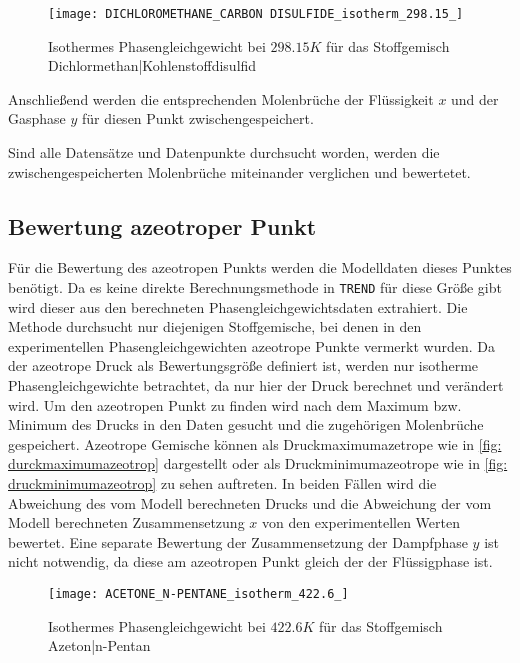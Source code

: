 \documentclass[../thesis.tex]{subfiles}
\begin{document}
\begin{figure}[htb]
	\centering
	\texttt{[image: DICHLOROMETHANE\_CARBON DISULFIDE\_isotherm\_298.15\_]}
	\caption{Isothermes Phasengleichgewicht bei $ 298.15 K$ für das Stoffgemisch Dichlormethan|Kohlenstoffdisulfid}
	\label{fig: phase_eq_datenausschluss}
\end{figure}

Anschließend werden die entsprechenden Molenbrüche der Flüssigkeit $x$ und der Gasphase $y$ für diesen Punkt zwischengespeichert.

Sind alle Datensätze und Datenpunkte durchsucht worden, werden die zwischengespeicherten Molenbrüche miteinander verglichen und bewertetet.

\subsection{Bewertung azeotroper Punkt}

Für die Bewertung des azeotropen Punkts werden die Modelldaten dieses Punktes benötigt. Da es keine direkte Berechnungsmethode in \texttt{TREND} für diese Größe gibt wird dieser aus den berechneten Phasengleichgewichtsdaten extrahiert. Die Methode durchsucht nur diejenigen Stoffgemische, bei denen in den experimentellen Phasengleichgewichten azeotrope Punkte vermerkt wurden. Da der azeotrope Druck als Bewertungsgröße definiert ist, werden nur isotherme Phasengleichgewichte betrachtet, da nur hier der Druck berechnet und verändert wird. Um den azeotropen Punkt zu finden wird nach dem Maximum bzw. Minimum des Drucks in den Daten gesucht und die zugehörigen Molenbrüche gespeichert. Azeotrope Gemische können als Druckmaximumazetrope wie in \autoref{fig: durckmaximumazeotrop} dargestellt oder als Druckminimumazeotrope wie in \autoref{fig: druckminimumazeotrop} zu sehen auftreten. In beiden Fällen wird die Abweichung des vom Modell berechneten Drucks und die Abweichung der vom Modell berechneten Zusammensetzung $x$ von den experimentellen Werten bewertet. Eine separate Bewertung der Zusammensetzung der Dampfphase $y$ ist nicht notwendig, da diese am azeotropen Punkt gleich der der Flüssigphase ist. 

\begin{figure}[htb]
	\centering
	\texttt{[image: ACETONE\_N-PENTANE\_isotherm\_422.6\_]}
	\caption{Isothermes Phasengleichgewicht bei $ 422$.$6 K$ für das Stoffgemisch Azeton|n-Pentan}
	\label{fig: durckmaximumazeotrop}
\end{figure}
\end{document}
